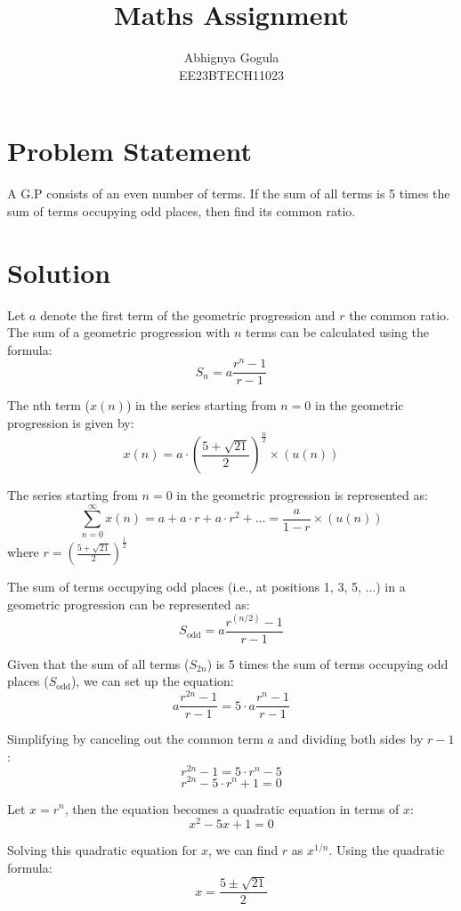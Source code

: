 \documentclass{article}
\begin{document}
\title{Maths Assignment}
\author{Abhignya Gogula\\
        EE23BTECH11023}
\maketitle

\section*{Problem Statement}
A G.P consists of an even number of terms. If the sum of all terms is 5 times the sum of terms occupying odd places, then find its common ratio.

\section*{Solution}
Let \( a \) denote the first term of the geometric progression and \( r \) the common ratio. The sum of a geometric progression with \( n \) terms can be calculated using the formula:
\[ S_n = a \frac{{r^n - 1}}{{r - 1}} \]

The nth term (\(x(n)\)) in the series starting from \(n = 0\) in the geometric progression is given by:
\[ x(n) = a \cdot \left(\frac{{5 + \sqrt{21}}}{2}\right)^{\frac{n}{2}} \times (u(n))\]

The series starting from \(n = 0\) in the geometric progression is represented as:
\[ \sum_{n=0}^{\infty} x(n) = a + a \cdot r + a \cdot r^2 + \dots = \frac{a}{1 - r} \times (u(n))\]
where \( r = \left(\frac{{5 + \sqrt{21}}}{2}\right)^{\frac{1}{2}} \)

The sum of terms occupying odd places (i.e., at positions 1, 3, 5, ...) in a geometric progression can be represented as:
\[ S_{\text{odd}} = a \frac{{r^{(n/2)} - 1}}{{r - 1}} \]

Given that the sum of all terms (\( S_{2n} \)) is 5 times the sum of terms occupying odd places (\( S_{\text{odd}} \)), we can set up the equation:
\[ a \frac{{r^{2n} - 1}}{{r - 1}} = 5 \cdot a \frac{{r^n - 1}}{{r - 1}} \]

Simplifying by canceling out the common term \( a \) and dividing both sides by \( r - 1 \):
\[ r^{2n} - 1 = 5 \cdot r^n - 5 \]
\[ r^{2n} - 5 \cdot r^n + 1 = 0 \]

Let \( x = r^n \), then the equation becomes a quadratic equation in terms of \( x \):
\[ x^2 - 5x + 1 = 0 \]

Solving this quadratic equation for \( x \), we can find \( r \) as \( x^{1/n} \). Using the quadratic formula:
\[ x = \frac{{5 \pm \sqrt{21}}}{2} \]
\end{document}
